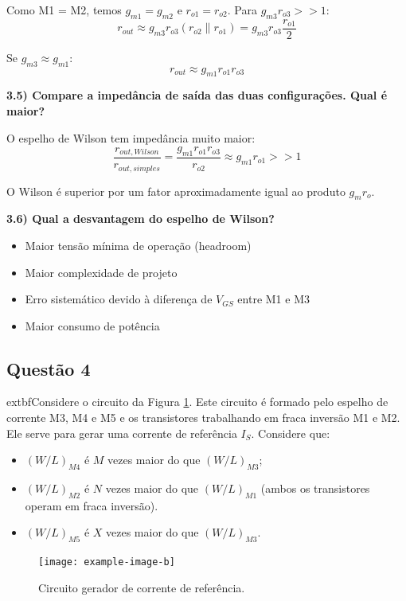 ﻿\documentclass[12pt,a4paper]{article}
\begin{document}
Como M1 = M2, temos $g_{m1} = g_{m2}$ e $r_{o1} = r_{o2}$. Para $g_{m3} r_{o3} >> 1$:
$$r_{out} \approx g_{m3} r_{o3} (r_{o2} \parallel r_{o1}) = g_{m3} r_{o3} \frac{r_{o1}}{2}$$

Se $g_{m3} \approx g_{m1}$:
$$\boxed{r_{out} \approx g_{m1} r_{o1} r_{o3}}$$

\textbf{3.5) Compare a impedância de saída das duas configurações. Qual é maior?}

O espelho de Wilson tem impedância muito maior:
$$\frac{r_{out,Wilson}}{r_{out,simples}} = \frac{g_{m1} r_{o1} r_{o3}}{r_{o2}} \approx g_{m1} r_{o1} >> 1$$

O Wilson é superior por um fator aproximadamente igual ao produto $g_m r_o$.

\textbf{3.6) Qual a desvantagem do espelho de Wilson?}

\begin{itemize}
    \item Maior tensão mínima de operação (headroom)
    \item Maior complexidade de projeto
    \item Erro sistemático devido à diferença de $V_{GS}$ entre M1 e M3
    \item Maior consumo de potência
\end{itemize}

\subsection*{Questão 4}
    	extbf{Considere o circuito da Figura \ref{fig:gerador_corrente}. Este circuito é formado pelo espelho de corrente M3, M4 e M5 e os transistores trabalhando em fraca inversão M1 e M2. Ele serve para gerar uma corrente de referência $I_S$. Considere que:}
\begin{itemize}
    \item $(W/L)_{M4}$ é $M$ vezes maior do que $(W/L)_{M3}$;
    \item $(W/L)_{M2}$ é $N$ vezes maior do que $(W/L)_{M1}$ (ambos os transistores operam em fraca inversão).
    \item $(W/L)_{M5}$ é $X$ vezes maior do que $(W/L)_{M3}$.
\end{itemize}

\begin{figure}[H]
    \centering
    \texttt{[image: example-image-b]}
    \caption{Circuito gerador de corrente de referência.}
    \label{fig:gerador_corrente}
\end{figure}
\end{document}
